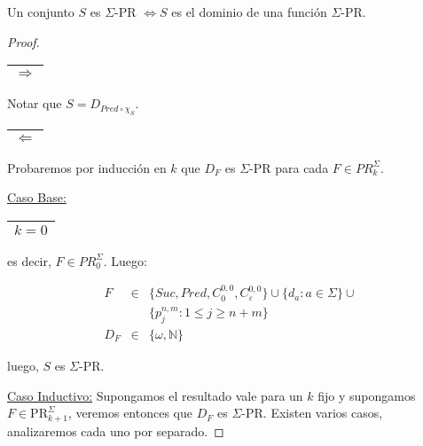   \begin{proposition}
    \PN Un conjunto $S$ es $\Sigma$-PR $\Leftrightarrow S$ es el dominio de una función $\Sigma$-PR.
  \end{proposition}
  \begin{proof}
    \begin{tabular}{|c|} \hline $\Rightarrow$ \\\hline \end{tabular} Notar que $S = D_{Pred \circ \chi_{S}}$.

    \begin{tabular}{|c|} \hline $\Leftarrow$ \\\hline \end{tabular} Probaremos por inducción en $k$ que $D_{F}$ es
    $\Sigma$-PR para cada $F \in PR_{k}^{\Sigma}$.

    \vspace{3mm}
    \underline{Caso Base:} \begin{tabular}{|c|} \hline $k = 0$ \\\hline \end{tabular} es decir, $F \in PR_{0}^{\Sigma}$.
    Luego:

    \begin{eqnarray*}
      F &\in& \{Suc, Pred, C_{0}^{0,0}, C_{\varepsilon}^{0,0}\} \cup \{d_{a}: a \in \Sigma\} \cup \\
      && \{p_{j}^{n,m}: 1 \leq j \geq n+m\} \\
      D_{F} &\in& \{\omega, \mathbb{N}\}
    \end{eqnarray*}

    \PN luego, $S$ es $\Sigma$-PR.

    \vspace{3mm}
    \underline{Caso Inductivo:} Supongamos el resultado vale para un $k$ fijo y supongamos $F \in
    \mathrm{PR}_{k+1}^{\Sigma}$, veremos entonces que $D_{F}$ es $\Sigma$-PR. Existen varios casos, analizaremos cada
    uno por separado.


\end{proof}
